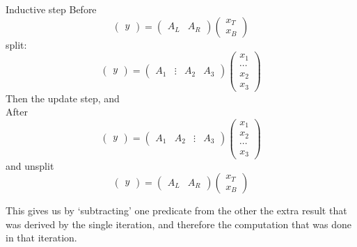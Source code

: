 \begin{block}{Inductive step}
  \small
  Before
  \[
  \begin{pmatrix}
    y
  \end{pmatrix}
  =
  \begin{pmatrix}
    A_L & A_R
  \end{pmatrix}
  \begin{pmatrix}
    x_T \\ x_B
  \end{pmatrix}
  \]
  split:
  \[
  \begin{pmatrix}
    y
  \end{pmatrix}
  =
  \begin{pmatrix}
    A_1 & \vdots & A_2 & A_3
  \end{pmatrix}
  \begin{pmatrix}
    x_1\\ \cdots \\ x_2 \\ x_3
  \end{pmatrix}
  \]
  Then the update step, and \\ After
  \[
  \begin{pmatrix}
    y
  \end{pmatrix}
  =
  \begin{pmatrix}
    A_1 & A_2  & \vdots & A_3
  \end{pmatrix}
  \begin{pmatrix}
    x_1 \\ x_2 \\ \cdots\\ x_3
  \end{pmatrix}
  \]
  and unsplit
  \[
  \begin{pmatrix}
    y
  \end{pmatrix}
  =
  \begin{pmatrix}
    A_L & A_R
  \end{pmatrix}
  \begin{pmatrix}
    x_T \\ x_B
  \end{pmatrix}
  \]
\end{block}

This gives us by `subtracting' one predicate from the other
the extra result that was derived by the single iteration,
and therefore the computation that was done in that iteration.

